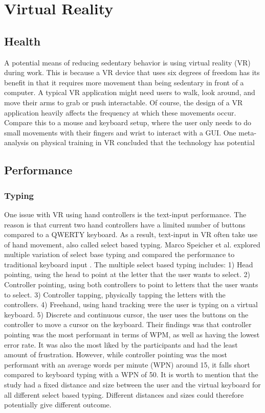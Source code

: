 \documentclass{sigchi}
\begin{document}
\section{Virtual Reality}

\subsection{Health}
A potential means of reducing sedentary behavior is using virtual reality (VR) during work. This is because a VR device that uses six degrees of freedom has its benefit in that it requires more movement than being sedentary in front of a computer. A typical VR application might need users to walk, look around, and move their arms to grab or push interactable. Of course, the design of a VR application heavily affects the frequency at which these movements occur. Compare this to a mouse and keyboard setup, where the user only needs to do small movements with their fingers and wrist to interact with a GUI. One meta-analysis on physical training in VR concluded that the technology has potential \cite{ng_effectiveness_2019}

\subsection{Performance}

\subsubsection{Typing}
One issue with VR using hand controllers is the text-input performance. The reason is that current two hand controllers have a limited number of buttons compared to a QWERTY keyboard. As a result, text-input in VR often take use of hand movement, also called select based typing. Marco Speicher et al. explored multiple variation of select base typing and compared the performance to traditional keyboard input \cite{speicher_selection-based_2018}. The multiple select based typing includes: 1) Head pointing, using the head to point at the letter that the user wants to select. 2) Controller pointing, using both controllers to point to letters that the user wants to select. 3) Controller tapping, physically tapping the letters with the controllers. 4) Freehand, using hand tracking were the user is typing on a virtual keyboard. 5) Discrete and continuous cursor, the user uses the buttons on the controller to move a cursor on the keyboard. Their findings was that controller pointing was the most performant in terms of WPM, as well as having the lowest error rate. It was also the most liked by the participants and had the least amount of frustration. However, while controller pointing was the most performant with an average words per minute (WPN) around 15, it falls short compared to keyboard typing with a WPN of 50. It is worth to mention that the study had a fixed distance and size between the user and the virtual keyboard for all different select based typing. Different distances and sizes could therefore potentially give different outcome.
\end{document}
